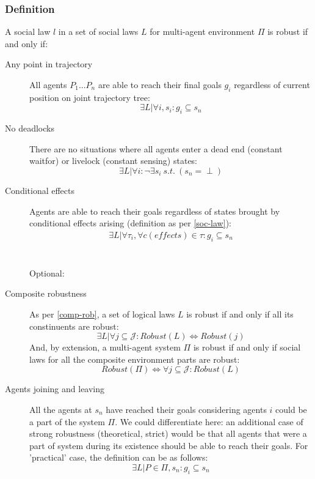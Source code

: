 \documentclass[fleqn,10pt]{olplainarticle}
\begin{document}
\subsubsection{Definition}
A social law $l$  in a set of social laws $L$ for multi-agent environment $\Pi$ is robust if and only if:
\begin{description}
    \item[Any point in trajectory] All agents $P_1...P_n$ are able to reach their final goals $g_i$ regardless of current position on joint trajectory tree:     \begin{equation}
        \exists L \vert \forall i, s_i: g_i \subseteq s_n
    \end{equation}
    \item[No deadlocks] There are no situations where all agents enter a dead end (constant waitfor) or livelock (constant sensing) states:     \begin{equation}
    \exists L \vert \forall i: \neg \exists s_i \ s.t.\ (s_n = \perp)
    \end{equation}
    \item [Conditional effects] Agents are able to reach their goals regardless of states brought by conditional effects arising (definition as per \ref{soc-law}):    \begin{equation}
        \begin{aligned}
            \exists L \vert \forall \tau_i, \forall c(effects) \in \tau: g_i \subseteq s_n
        \end{aligned}
    \end{equation}
    \\\\
    Optional:
    \item[Composite robustness] As per \ref{comp-rob}, a set of logical laws $L$ is robust if and only if all its constinuents are robust:    \begin{equation}
        \exists L \vert \forall j \subseteq \mathcal{J}: Robust(L) \iff Robust(j)
    \end{equation}
    And, by extension, a multi-agent system $\Pi$ is robust if and only if social laws for all the composite environment parts are robust:
\begin{equation}
    Robust(\Pi) \iff \forall j \subseteq \mathcal{J}: Robust(L)
\end{equation}
    \item[Agents joining and leaving] All the agents at $s_n$ have reached their goals considering agents $i$ could be a part of the system $\Pi$. We could differentiate here: an additional case of strong robustness (theoretical, strict) would be that all agents that were a part of system during its existence should be able to reach their goals. For 'practical' case, the definition can be as follows:  \begin{equation}
        \exists L \vert P \in \Pi, s_n: g_i \subseteq s_n
    \end{equation}
\end{description}
\end{document}
